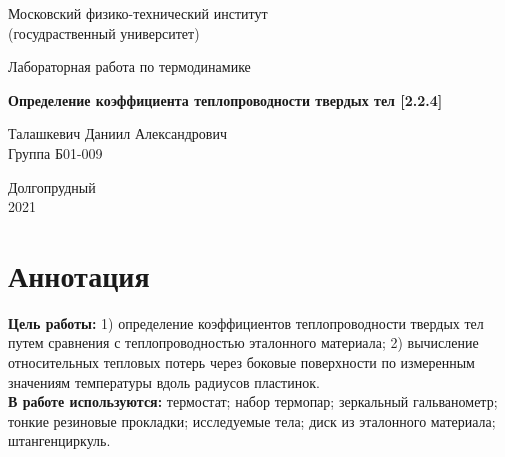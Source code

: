 \documentclass[a4paper,11.5pt]{article} %
\begin{document}


\begin{titlepage}

	\newpage
	\begin{center}
		\normalsize Московский физико-технический институт \\(госудраственный 			университет)
	\end{center}

	\vspace{6em}

	\begin{center}
		\Large Лабораторная работа по термодинамике\\
	\end{center}

	\vspace{1em}

	\begin{center}
		\large \textbf{Определение коэффициента теплопроводности твердых тел [2.2.4]}
	\end{center}

	\vspace{2em}

	\begin{center}
		\large Талашкевич Даниил Александрович\\
		Группа Б01-009
	\end{center}

	\vspace{\fill}

	\begin{center}
	Долгопрудный \\2021
	\end{center}
	
\end{titlepage}



	\thispagestyle{empty}
	\newpage
	\tableofcontents
	\newpage
	\setcounter{page}{1}




\section{Аннотация}
\textbf{Цель работы:} 1) определение коэффициентов теплопроводности
твердых тел путем сравнения с теплопроводностью эталонного материала; 2) вычисление относительных тепловых потерь через боковые поверхности по измеренным значениям температуры вдоль
радиусов пластинок.\\
\textbf{В работе используются:} термостат; набор термопар; зеркальный гальванометр; тонкие резиновые прокладки; исследуемые тела; диск из эталонного материала; штангенциркуль.
\end{document}
